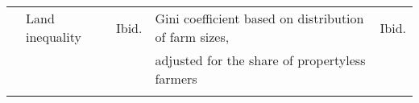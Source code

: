 \begin{tabular}{@{}l|llll@{}}
			      & Land inequality                                               & Ibid.                        & Gini coefficient based on distribution of farm sizes,     & Ibid.   \\
  				&                  &          &  adjusted for the share of propertyless farmers           &  	\\   
                                   &                                                             &                            &               &            \\        
                                   

\end{tabular}
